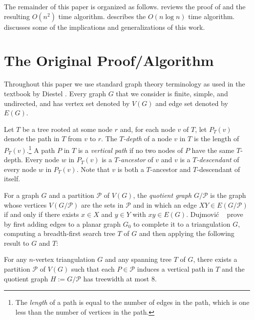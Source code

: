 \documentclass[kpfonts]{patmorin}
\begin{document}
The remainder of this paper is organized as follows.  reviews the proof of  and the resulting $O(n^2)$ time algorithm.   describes the $O(n\log n)$ time algorithm.   discusses some of the implications and generalizations of this work.


\section{The Original Proof/Algorithm}

Throughout this paper we use standard graph theory terminology as used in the textbook by Diestel \cite{diestel:graph}.  Every graph $G$ that we consider is finite, simple, and undirected, and has vertex set denoted by $V(G)$ and edge set denoted by $E(G)$.

Let $T$ be a tree rooted at some node $r$ and, for each node $v$ of $T$, let $P_T(v)$ denote the path in $T$ from $v$ to $r$.  The \emph{$T$-depth} of a node $v$ in $T$ is the length of $P_T(v)$.\footnote{The \emph{length} of a path is equal to the number of edges in the path, which is one less than the number of vertices in the path.}  A path $P$ in $T$ is a \emph{vertical path} if no two nodes of $P$ have the same $T$-depth.  Every node $w$ in $P_T(v)$ is a \emph{$T$-ancestor} of $v$ and $v$ is a \emph{$T$-descendant} of every node $w$ in $P_T(v)$.  Note that $v$ is both a $T$-ancestor and $T$-descendant of itself.

For a graph $G$ and a partition $\mathcal{P}$ of $V(G)$, the \emph{quotient graph} $G/\mathcal{P}$ is the graph whose vertices $V(G/\mathcal{P})$ are the sets in $\mathcal{P}$ and in which an edge $XY\in E(G/\mathcal{P})$ if and only if there exists $x\in X$ and $y\in Y$ with $xy\in E(G)$.  Dujmović \etal\  \cite{dujmovic.joret.ea:planar} prove  by first adding edges to a planar graph $G_0$ to complete it to a triangulation $G$, computing a breadth-first search tree $T$ of $G$ and then applying the following result to $G$ and $T$:

\begin{thm}
  For any $n$-vertex triangulation $G$ and any spanning tree $T$ of $G$, there exists a partition $\mathcal{P}$ of $V(G)$ such that each $P\in\mathcal{P}$ induces a vertical path in $T$ and the quotient graph $H:=G/\mathcal{P}$ has treewidth at most $8$.
\end{thm}
\end{document}
